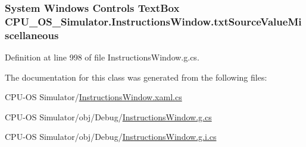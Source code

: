\subsubsection[{txt\+Source\+Value\+Miscellaneous}]{\setlength{\rightskip}{0pt plus 5cm}System Windows Controls Text\+Box C\+P\+U\+\_\+\+O\+S\+\_\+\+Simulator.\+Instructions\+Window.\+txt\+Source\+Value\+Miscellaneous\hspace{0.3cm}{\ttfamily [package]}}\label{class_c_p_u___o_s___simulator_1_1_instructions_window_a555d604d5869d89442a35900abc35914}


Definition at line 998 of file Instructions\+Window.\+g.\+cs.



The documentation for this class was generated from the following files\+:\begin{DoxyCompactItemize}
\item 
C\+P\+U-\/\+O\+S Simulator/\hyperlink{_instructions_window_8xaml_8cs}{Instructions\+Window.\+xaml.\+cs}\item 
C\+P\+U-\/\+O\+S Simulator/obj/\+Debug/\hyperlink{_instructions_window_8g_8cs}{Instructions\+Window.\+g.\+cs}\item 
C\+P\+U-\/\+O\+S Simulator/obj/\+Debug/\hyperlink{_instructions_window_8g_8i_8cs}{Instructions\+Window.\+g.\+i.\+cs}\end{DoxyCompactItemize}
